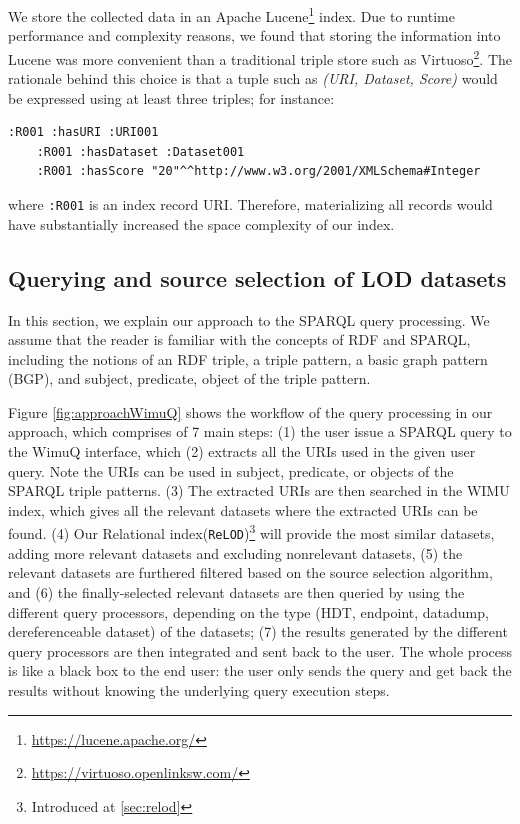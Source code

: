 \documentclass[sw]{iosart2x}
\begin{document}
We store the collected data in an Apache Lucene\footnote{\url{https://lucene.apache.org/}} index.
Due to runtime performance and complexity reasons, we found that storing the information into Lucene was more convenient than a traditional triple store such as Virtuoso\footnote{\url{https://virtuoso.openlinksw.com/}}.
The rationale behind this choice is that a tuple such as \emph{(URI, Dataset, Score)} would be expressed using at least three triples; for instance:
\begin{lstlisting}[language=SPARQL]
    :R001 :hasURI :URI001
    :R001 :hasDataset :Dataset001
    :R001 :hasScore "20"^^http://www.w3.org/2001/XMLSchema#Integer
\end{lstlisting}

where \texttt{:R001} is an index record URI. Therefore, materializing all records would have substantially increased the space complexity of our index.

\subsection{Querying and source selection of LOD datasets}
In this section, we explain our approach to the SPARQL query processing. We assume that the reader is familiar with the concepts of RDF and SPARQL, including the notions of an RDF triple, a triple pattern, a basic graph pattern (BGP), and subject, predicate, object of the triple pattern.

Figure \ref{fig:approachWimuQ} shows the workflow of the query processing in our approach, which comprises of 7 main steps: (1) the user issue a SPARQL query to the WimuQ interface, which (2) extracts all the URIs used in the given user query. Note the URIs can be used in subject, predicate, or objects of the SPARQL triple patterns. (3) The extracted URIs are then searched in the WIMU index, which gives all the relevant datasets where the extracted URIs can be found. (4) Our Relational index(\texttt{ReLOD})\footnote{Introduced at \cref{sec:relod}} will provide the most similar datasets, adding more relevant datasets and excluding nonrelevant datasets, (5) the relevant datasets are furthered filtered based on the source selection algorithm, and (6) the finally-selected relevant datasets are then queried by using the different query processors, depending on the type (HDT, endpoint, datadump, dereferenceable dataset) of the datasets; (7) the results generated by the different query processors are then integrated and sent back to the user. The whole process is like a black box to the end user: the user only sends the query and get back the results without knowing the underlying query execution steps. %
\end{document}
